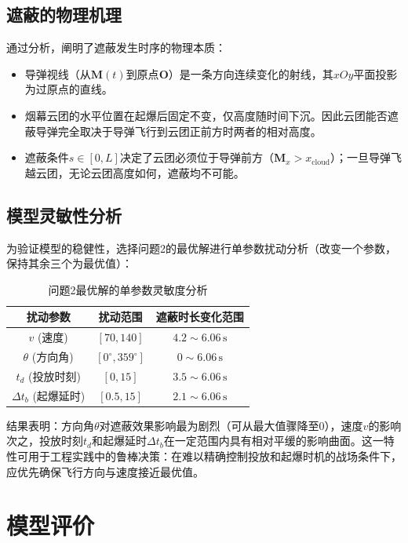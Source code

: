\documentclass[12pt,a4paper]{ctexart}
\newcommand{\vect}[1]{\boldsymbol{#1}}
\begin{document}
\subsection{遮蔽的物理机理}

通过分析，阐明了遮蔽发生时序的物理本质：

\begin{itemize}
    \item 导弹视线（从$\vect{M}(t)$到原点$\vect{O}$）是一条方向连续变化的射线，其$xOy$平面投影为过原点的直线。
    \item 烟幕云团的水平位置在起爆后固定不变，仅高度随时间下沉。因此云团能否遮蔽导弹完全取决于导弹飞行到云团正前方时两者的相对高度。
    \item 遮蔽条件$s \in [0,L]$决定了云团必须位于导弹前方（$\vect{M}_x > x_{\text{cloud}}$）；一旦导弹飞越云团，无论云团高度如何，遮蔽均不可能。
\end{itemize}

\subsection{模型灵敏性分析}

为验证模型的稳健性，选择问题2的最优解进行单参数扰动分析（改变一个参数，保持其余三个为最优值）：

\begin{table}[H]
\centering
\caption{问题2最优解的单参数灵敏度分析}
\label{tab:sensitivity}
\begin{tabular}{ccc}
\toprule
扰动参数 & 扰动范围 & 遮蔽时长变化范围 \\
\midrule
$v$ (速度) & $[70, 140]$ & $4.2 \sim 6.06\,\text{s}$ \\
$\theta$ (方向角) & $[0^\circ, 359^\circ]$ & $0 \sim 6.06\,\text{s}$ \\
$t_d$ (投放时刻) & $[0, 15]$ & $3.5 \sim 6.06\,\text{s}$ \\
$\Delta t_b$ (起爆延时) & $[0.5, 15]$ & $2.1 \sim 6.06\,\text{s}$ \\
\bottomrule
\end{tabular}
\end{table}

结果表明：方向角$\theta$对遮蔽效果影响最为剧烈（可从最大值骤降至$0$），速度$v$的影响次之，投放时刻$t_d$和起爆延时$\Delta t_b$在一定范围内具有相对平缓的影响曲面。这一特性可用于工程实践中的鲁棒决策：在难以精确控制投放和起爆时机的战场条件下，应优先确保飞行方向与速度接近最优值。

\section{模型评价}
\end{document}

